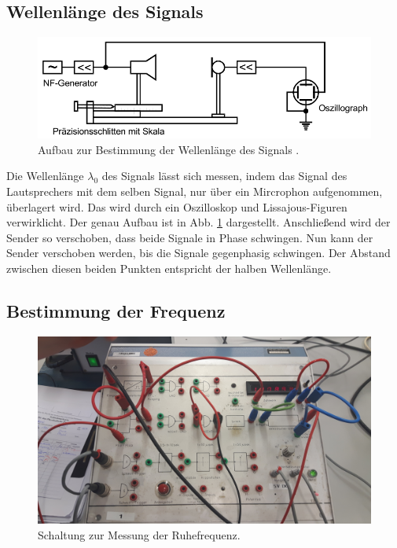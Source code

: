 \subsection{Wellenlänge des Signals}
\label{sec:Wellenlänge}
\begin{figure}
  \centering
  \includegraphics[width = \textwidth]{./Abbildungen/Schallgeschwindigkeit.PNG}
  \caption{Aufbau zur Bestimmung der Wellenlänge des Signals \cite{Anleitung}.}
  \label{fig:Wellenlänge}
\end{figure}

Die Wellenlänge $\lambda_0$ des Signals lässt sich messen, indem das Signal
des Lautsprechers mit dem selben Signal, nur über ein Mircrophon aufgenommen,
überlagert wird. Das wird durch ein Oszilloskop und Lissajous-Figuren verwirklicht.
Der genau Aufbau ist in Abb. \ref{fig:Wellenlänge} dargestellt.
Anschließend wird der Sender so verschoben, dass beide Signale in Phase
schwingen. Nun kann der Sender verschoben werden, bis die Signale gegenphasig
schwingen. Der Abstand zwischen diesen beiden Punkten entspricht der halben
Wellenlänge.
\FloatBarrier

\subsection{Bestimmung der Frequenz}
\label{sec:Frequenz}

\begin{figure}
  \centering
  \includegraphics[width = \textwidth]{./Abbildungen/Frequenzmessung.jpg}
  \caption{Schaltung zur Messung der Ruhefrequenz.}
  \label{fig:Ruhefrequenz}
\end{figure}

